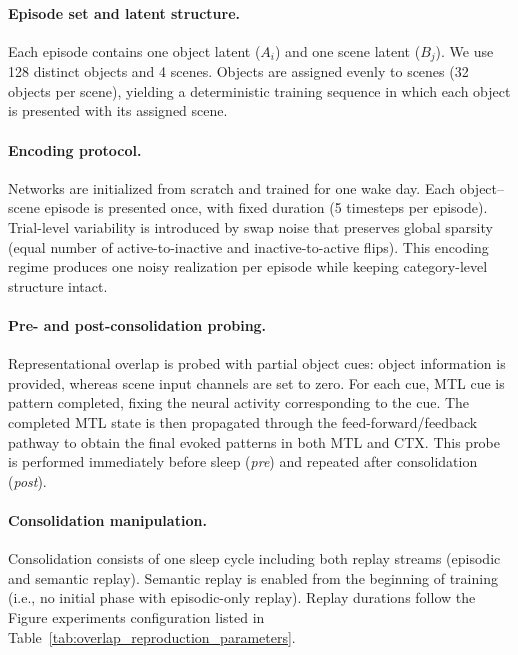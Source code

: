 \documentclass{article}
\begin{document}
\paragraph{Episode set and latent structure.}
Each episode contains one object latent ($A_i$) and one scene latent ($B_j$). We use 128 distinct objects and 4 scenes. Objects are assigned evenly to scenes (32 objects per scene), yielding a deterministic training sequence in which each object is presented with its assigned scene.

\paragraph{Encoding protocol.}
Networks are initialized from scratch and trained for one wake day. Each object--scene episode is presented once, with fixed duration (5 timesteps per episode). Trial-level variability is introduced by swap noise that preserves global sparsity (equal number of active-to-inactive and inactive-to-active flips). This encoding regime produces one noisy realization per episode while keeping category-level structure intact.

\paragraph{Pre- and post-consolidation probing.}
Representational overlap is probed with partial object cues: object information is provided, whereas scene input channels are set to zero. For each cue, MTL cue is pattern completed, fixing the neural activity corresponding to the cue. The completed MTL state is then propagated through the feed-forward/feedback pathway to obtain the final evoked patterns in both MTL and CTX. This probe is performed immediately before sleep (\textit{pre}) and repeated after consolidation (\textit{post}).

\paragraph{Consolidation manipulation.}
Consolidation consists of one sleep cycle including both replay streams (episodic and semantic replay). Semantic replay is enabled from the beginning of training (i.e., no initial phase with episodic-only replay). Replay durations follow the Figure experiments configuration listed in Table~\ref{tab:overlap_reproduction_parameters}.
\end{document}
